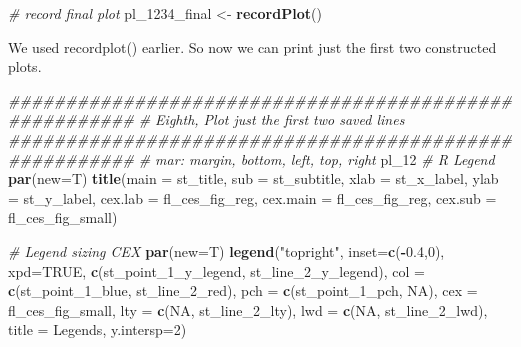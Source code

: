 \documentclass[
]{book}
\newenvironment{Shaded}{\begin{snugshade}}{\end{snugshade}}
\newcommand{\CommentTok}[1]{\textcolor[rgb]{0.56,0.35,0.01}{\textit{#1}}}
\newcommand{\DataTypeTok}[1]{\textcolor[rgb]{0.13,0.29,0.53}{#1}}
\newcommand{\DecValTok}[1]{\textcolor[rgb]{0.00,0.00,0.81}{#1}}
\newcommand{\FloatTok}[1]{\textcolor[rgb]{0.00,0.00,0.81}{#1}}
\newcommand{\KeywordTok}[1]{\textcolor[rgb]{0.13,0.29,0.53}{\textbf{#1}}}
\newcommand{\NormalTok}[1]{#1}
\newcommand{\OperatorTok}[1]{\textcolor[rgb]{0.81,0.36,0.00}{\textbf{#1}}}
\newcommand{\OtherTok}[1]{\textcolor[rgb]{0.56,0.35,0.01}{#1}}
\newcommand{\StringTok}[1]{\textcolor[rgb]{0.31,0.60,0.02}{#1}}
\begin{document}
\begin{Shaded}
\begin{Highlighting}[]
\CommentTok{\# record final plot}
\NormalTok{pl\_}\DecValTok{1234}\NormalTok{\_final \textless{}{-}}\StringTok{ }\KeywordTok{recordPlot}\NormalTok{()}
\end{Highlighting}
\end{Shaded}

We used recordplot() earlier. So now we can print just the first two constructed plots.

\begin{Shaded}
\begin{Highlighting}[]
\CommentTok{\#\#\#\#\#\#\#\#\#\#\#\#\#\#\#\#\#\#\#\#\#\#\#\#\#\#\#\#\#\#\#\#\#\#\#\#\#\#\#\#\#\#\#\#\#\#\#\#\#\#\#\#\#\#\#}
\CommentTok{\# Eighth, Plot just the first two saved lines}
\CommentTok{\#\#\#\#\#\#\#\#\#\#\#\#\#\#\#\#\#\#\#\#\#\#\#\#\#\#\#\#\#\#\#\#\#\#\#\#\#\#\#\#\#\#\#\#\#\#\#\#\#\#\#\#\#\#\#}
\CommentTok{\# mar: margin, bottom, left, top, right}
\NormalTok{pl\_}\DecValTok{12}
\CommentTok{\# R Legend}
\KeywordTok{par}\NormalTok{(}\DataTypeTok{new=}\NormalTok{T)}
\KeywordTok{title}\NormalTok{(}\DataTypeTok{main =}\NormalTok{ st\_title, }\DataTypeTok{sub =}\NormalTok{ st\_subtitle, }\DataTypeTok{xlab =}\NormalTok{ st\_x\_label, }\DataTypeTok{ylab =}\NormalTok{ st\_y\_label,}
      \DataTypeTok{cex.lab =}\NormalTok{ fl\_ces\_fig\_reg,}
      \DataTypeTok{cex.main =}\NormalTok{ fl\_ces\_fig\_reg,}
      \DataTypeTok{cex.sub =}\NormalTok{ fl\_ces\_fig\_small)}

\CommentTok{\# Legend sizing CEX}
\KeywordTok{par}\NormalTok{(}\DataTypeTok{new=}\NormalTok{T)}
\KeywordTok{legend}\NormalTok{(}\StringTok{"topright"}\NormalTok{,}
       \DataTypeTok{inset=}\KeywordTok{c}\NormalTok{(}\OperatorTok{{-}}\FloatTok{0.4}\NormalTok{,}\DecValTok{0}\NormalTok{),}
       \DataTypeTok{xpd=}\OtherTok{TRUE}\NormalTok{,}
       \KeywordTok{c}\NormalTok{(st\_point\_}\DecValTok{1}\NormalTok{\_y\_legend, st\_line\_}\DecValTok{2}\NormalTok{\_y\_legend),}
       \DataTypeTok{col =} \KeywordTok{c}\NormalTok{(st\_point\_}\DecValTok{1}\NormalTok{\_blue, st\_line\_}\DecValTok{2}\NormalTok{\_red),}
       \DataTypeTok{pch =} \KeywordTok{c}\NormalTok{(st\_point\_}\DecValTok{1}\NormalTok{\_pch, }\OtherTok{NA}\NormalTok{),}
       \DataTypeTok{cex =}\NormalTok{ fl\_ces\_fig\_small,}
       \DataTypeTok{lty =} \KeywordTok{c}\NormalTok{(}\OtherTok{NA}\NormalTok{, st\_line\_}\DecValTok{2}\NormalTok{\_lty),}
       \DataTypeTok{lwd =} \KeywordTok{c}\NormalTok{(}\OtherTok{NA}\NormalTok{, st\_line\_}\DecValTok{2}\NormalTok{\_lwd),}
       \DataTypeTok{title =} \StringTok{\textquotesingle{}Legends\textquotesingle{}}\NormalTok{,}
       \DataTypeTok{y.intersp=}\DecValTok{2}\NormalTok{)}
\end{Highlighting}
\end{Shaded}
\end{document}

